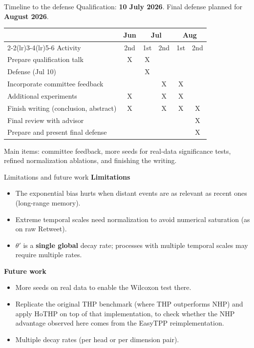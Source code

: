 \documentclass[aspectratio=169]{beamer}
\begin{document}
\begin{frame}{Timeline to the defense}
  Qualification: \textbf{10 July 2026}. Final defense planned for \textbf{August 2026}.
  \vspace{0.4em}
  \begin{table}
    \centering \small
    \begin{tabular}{lccccc}
      \toprule
       & Jun & \multicolumn{2}{c}{Jul} & \multicolumn{2}{c}{Aug} \\
      \cmidrule(lr){2-2}\cmidrule(lr){3-4}\cmidrule(lr){5-6}
      Activity & 2nd & 1st & 2nd & 1st & 2nd \\
      \midrule
      Prepare qualification talk        & X & X &   &   &   \\
      Defense (Jul 10)            &   & X &   &   &   \\
      Incorporate committee feedback    &   &   & X & X &   \\
      Additional experiments            & X &   & X & X &   \\
      Finish writing (conclusion, abstract) & X &   & X & X & X \\
      Final review with advisor         &   &   &   &   & X \\
      Prepare and present final defense &   &   &   &   & X \\
      \bottomrule
    \end{tabular}
  \end{table}
  \vspace{0.2em}
  {\small Main items: committee feedback, more seeds for real-data significance
  tests, refined normalization ablations, and finishing the writing.}
\end{frame}

\begin{frame}{Limitations and future work}
  \textbf{Limitations}
  \begin{itemize}
    \item The exponential bias hurts when distant events are as relevant as recent
          ones (long-range memory).
    \item Extreme temporal scales need normalization to avoid numerical saturation
          (as on raw Retweet).
    \item $\theta'$ is a \textbf{single global} decay rate; processes with multiple
          temporal scales may require multiple rates.
  \end{itemize}
  \vspace{0.3em}
  \textbf{Future work}
  \begin{itemize}
    \item More seeds on real data to enable the Wilcoxon test there.
    \item Replicate the original THP benchmark (where THP outperforms NHP)
          and apply HoTHP on top of that implementation, to check whether
          the NHP advantage observed here comes from the EasyTPP
          reimplementation.
    \item Multiple decay rates (per head or per dimension pair).
  \end{itemize}
\end{frame}
\end{document}
